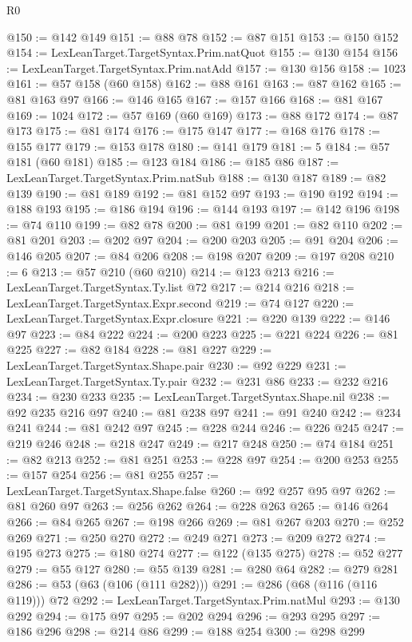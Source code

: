 \begin{lexlean}{R0}
\begin{coremodule}
@150 := @142 @149
@151 := @88 @78
@152 := @87 @151
@153 := @150 @152
@154 := LexLeanTarget.TargetSyntax.Prim.natQuot
@155 := @130 @154
@156 := LexLeanTarget.TargetSyntax.Prim.natAdd
@157 := @130 @156
@158 := 1023
@161 := @57 @158 (@60 @158)
@162 := @88 @161
@163 := @87 @162
@165 := @81 @163 @97
@166 := @146 @165
@167 := @157 @166
@168 := @81 @167
@169 := 1024
@172 := @57 @169 (@60 @169)
@173 := @88 @172
@174 := @87 @173
@175 := @81 @174
@176 := @175 @147
@177 := @168 @176
@178 := @155 @177
@179 := @153 @178
@180 := @141 @179
@181 := 5
@184 := @57 @181 (@60 @181)
@185 := @123 @184
@186 := @185 @86
@187 := LexLeanTarget.TargetSyntax.Prim.natSub
@188 := @130 @187
@189 := @82 @139
@190 := @81 @189
@192 := @81 @152 @97
@193 := @190 @192
@194 := @188 @193
@195 := @186 @194
@196 := @144 @193
@197 := @142 @196
@198 := @74 @110
@199 := @82 @78
@200 := @81 @199
@201 := @82 @110
@202 := @81 @201
@203 := @202 @97
@204 := @200 @203
@205 := @91 @204
@206 := @146 @205
@207 := @84 @206
@208 := @198 @207
@209 := @197 @208
@210 := 6
@213 := @57 @210 (@60 @210)
@214 := @123 @213
@216 := LexLeanTarget.TargetSyntax.Ty.list @72
@217 := @214 @216
@218 := LexLeanTarget.TargetSyntax.Expr.second
@219 := @74 @127
@220 := LexLeanTarget.TargetSyntax.Expr.closure
@221 := @220 @139
@222 := @146 @97
@223 := @84 @222
@224 := @200 @223
@225 := @221 @224
@226 := @81 @225
@227 := @82 @184
@228 := @81 @227
@229 := LexLeanTarget.TargetSyntax.Shape.pair
@230 := @92 @229
@231 := LexLeanTarget.TargetSyntax.Ty.pair
@232 := @231 @86
@233 := @232 @216
@234 := @230 @233
@235 := LexLeanTarget.TargetSyntax.Shape.nil
@238 := @92 @235 @216 @97
@240 := @81 @238 @97
@241 := @91 @240
@242 := @234 @241
@244 := @81 @242 @97
@245 := @228 @244
@246 := @226 @245
@247 := @219 @246
@248 := @218 @247
@249 := @217 @248
@250 := @74 @184
@251 := @82 @213
@252 := @81 @251
@253 := @228 @97
@254 := @200 @253
@255 := @157 @254
@256 := @81 @255
@257 := LexLeanTarget.TargetSyntax.Shape.false
@260 := @92 @257 @95 @97
@262 := @81 @260 @97
@263 := @256 @262
@264 := @228 @263
@265 := @146 @264
@266 := @84 @265
@267 := @198 @266
@269 := @81 @267 @203
@270 := @252 @269
@271 := @250 @270
@272 := @249 @271
@273 := @209 @272
@274 := @195 @273
@275 := @180 @274
@277 := @122 (@135 @275)
@278 := @52 @277
@279 := @55 @127
@280 := @55 @139
@281 := @280 @64
@282 := @279 @281
@286 := @53 (@63 (@106 (@111 @282)))
@291 := @286 (@68 (@116 (@116 @119))) @72
@292 := LexLeanTarget.TargetSyntax.Prim.natMul
@293 := @130 @292
@294 := @175 @97
@295 := @202 @294
@296 := @293 @295
@297 := @186 @296
@298 := @214 @86
@299 := @188 @254
@300 := @298 @299

\end{coremodule}
\end{lexlean}
